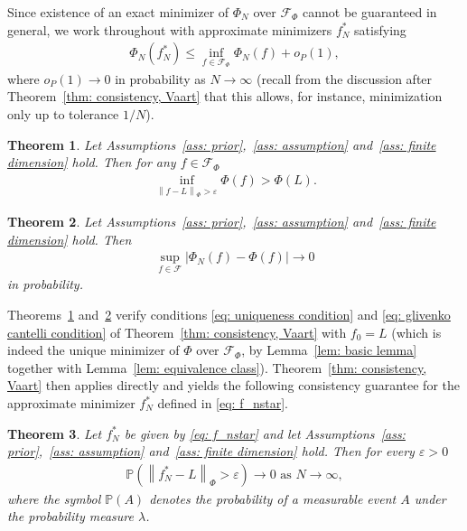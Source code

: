 \documentclass{amsart}
\newtheorem{theorem}{Theorem}[section]
\theoremstyle{definition}
\newcommand{\norm}[1]{\left\|#1\right\|}
\newcommand{\F}{\mathcal{F}}
\begin{document}
Since existence of an exact minimizer of $\Phi_N$ over $\F_\Phi$ cannot be
guaranteed in general, we work throughout with approximate minimizers $f_N^*$ satisfying
\begin{eqnarray}\label{eq: f_nstar}
    \Phi_N(f_N^*) \le \inf\limits_{f \in \F_{\Phi} } \Phi_N(f) +o_P(1),
\end{eqnarray}
where $o_P(1) \to 0$ in probability as $N \to \infty$ (recall from the
discussion after Theorem~\ref{thm: consistency, Vaart} that this allows,
for instance, minimization only up to tolerance $1/N$).
\begin{theorem}\label{lem: uniqueness cond}
Let Assumptions~\ref{ass: prior},~\ref{ass: assumption} and~\ref{ass: finite dimension} hold. Then for any $f \in \F_\Phi$
    \begin{eqnarray*}
        \inf\limits_{\norm{f-L}_\Phi > \varepsilon} \Phi(f) > \Phi(L).
    \end{eqnarray*}
\end{theorem}
\begin{theorem}\label{thm: M estimation}
    Let Assumptions~\ref{ass: prior},~\ref{ass: assumption} and~\ref{ass: finite dimension} hold.
    Then
    \begin{eqnarray*}
         \sup\limits_{f \in \F} |
         \Phi_N(f) - \Phi(f) | \rightarrow 0
    \end{eqnarray*}
    in probability.
\end{theorem}
Theorems~\ref{lem: uniqueness cond} and~\ref{thm: M estimation} verify
conditions \eqref{eq: uniqueness condition} and
\eqref{eq: glivenko cantelli condition} of
Theorem~\ref{thm: consistency, Vaart} with $f_0 = L$ (which is indeed the
unique minimizer of $\Phi$ over $\F_\Phi$, by
Lemma~\ref{lem: basic lemma} together with
Lemma~\ref{lem: equivalence class}). Theorem~\ref{thm: consistency, Vaart}
then applies directly and yields the following consistency guarantee for
the approximate minimizer $f_N^*$ defined in \eqref{eq: f_nstar}.
\begin{theorem}\label{thm: M estimation ours}
    Let $f_N^*$ be given by \eqref{eq: f_nstar} and let Assumptions~\ref{ass: prior},~\ref{ass: assumption} and~\ref{ass: finite dimension} hold. Then for every $\varepsilon > 0$
    \begin{eqnarray*}
        \mathbb{P}(\norm{f_N^* - L}_\Phi > \varepsilon) \rightarrow 0  \text{ as } N \rightarrow \infty,
    \end{eqnarray*}
    where the symbol $\mathbb{P}(A)$ denotes the probability of a measurable event $A$ under the probability measure $\lambda$.
\end{theorem}
\end{document}

